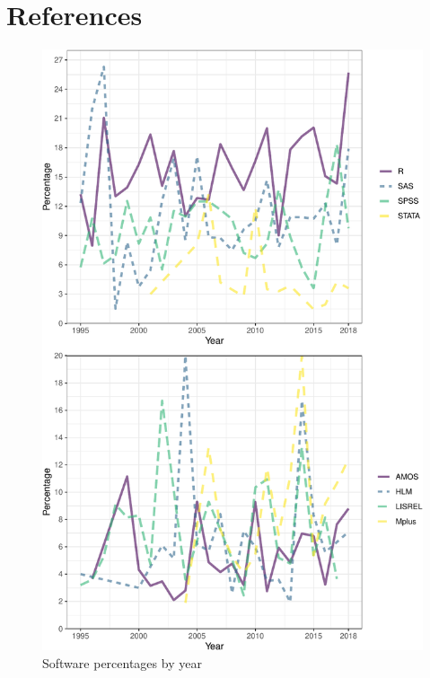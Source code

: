 \documentclass[english,,man]{apa6}
\theoremstyle{definition}
\theoremstyle{definition}
\theoremstyle{definition}
\theoremstyle{remark}
\begin{document}
\hypertarget{references}{%
\section{References}\label{references}}

\setlength{\parindent}{-0.5in}
\setlength{\leftskip}{0.5in}

\begin{figure}
\centering
\includegraphics{software_files/figure-latex/software-year-at1-1.pdf}
\caption{\label{fig:software-year-at1}Software percentages by year}
\end{figure}
\end{document}
